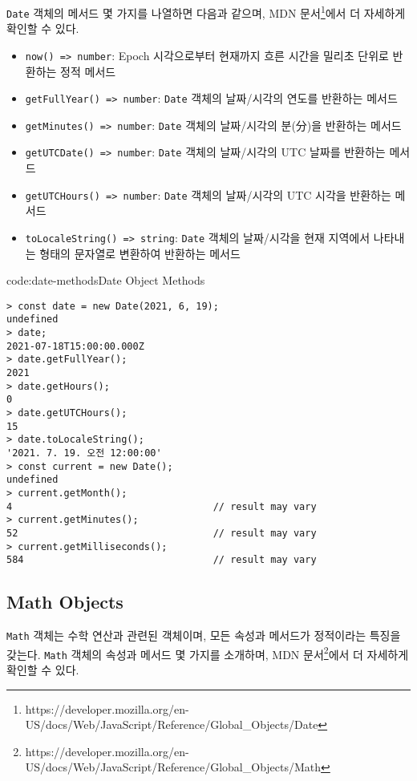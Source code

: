 \texttt{Date} 객체의 메서드 몇 가지를 나열하면 다음과 같으며, MDN 문서\footnote{https://developer.mozilla.org/en-US/docs/Web/JavaScript/Reference/Global\_Objects/Date}에서 더 자세하게 확인할 수 있다.

\begin{itemize}
    \item \texttt{now() => number}: Epoch 시각으로부터 현재까지 흐른 시간을 밀리초 단위로 반환하는 정적 메서드
    \item \texttt{getFullYear() => number}: \texttt{Date} 객체의 날짜/시각의 연도를 반환하는 메서드
    \item \texttt{getMinutes() => number}: \texttt{Date} 객체의 날짜/시각의 분(分)을 반환하는 메서드
    \item \texttt{getUTCDate() => number}: \texttt{Date} 객체의 날짜/시각의 UTC 날짜를 반환하는 메서드
    \item \texttt{getUTCHours() => number}: \texttt{Date} 객체의 날짜/시각의 UTC 시각을 반환하는 메서드
    \item \texttt{toLocaleString() => string}: \texttt{Date} 객체의 날짜/시각을 현재 지역에서 나타내는 형태의 문자열로 변환하여 반환하는 메서드
\end{itemize}

\begin{codeenv}{code:date-methods}{Date Object Methods}\begin{verbatim}
> const date = new Date(2021, 6, 19);
undefined
> date;
2021-07-18T15:00:00.000Z
> date.getFullYear();
2021
> date.getHours();
0
> date.getUTCHours();
15
> date.toLocaleString();
'2021. 7. 19. 오전 12:00:00'
> const current = new Date();
undefined
> current.getMonth();
4                                   // result may vary
> current.getMinutes();
52                                  // result may vary
> current.getMilliseconds();
584                                 // result may vary
\end{verbatim}
\end{codeenv}
\newpage

\subsection*{Math Objects}

\texttt{Math} 객체는 수학 연산과 관련된 객체이며, 모든 속성과 메서드가 정적이라는 특징을 갖는다. \texttt{Math} 객체의 속성과 메서드 몇 가지를 소개하며, MDN 문서\footnote{https://developer.mozilla.org/en-US/docs/Web/JavaScript/Reference/Global\_Objects/Math}에서 더 자세하게 확인할 수 있다.

